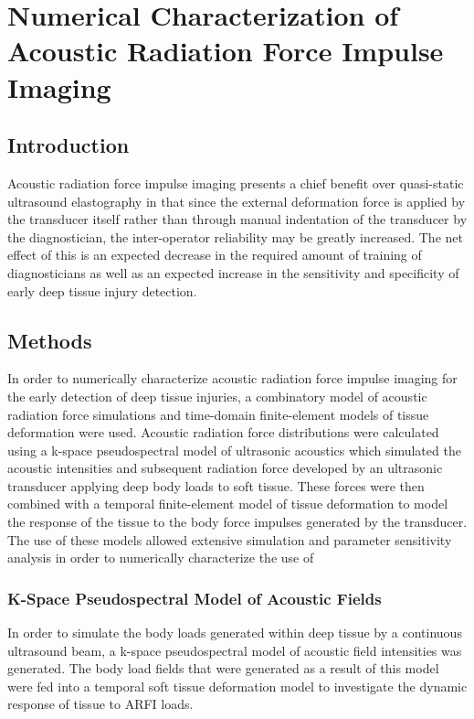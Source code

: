 \chapter{Numerical Characterization of Acoustic Radiation Force Impulse Imaging}
	\label{chap:arfi}
	\section{Introduction}
		Acoustic radiation force impulse imaging presents a chief benefit over quasi-static ultrasound elastography in that since the external deformation force is applied by the transducer itself rather than through manual indentation of the transducer by the diagnostician, the inter-operator reliability may be greatly increased. The net effect of this is an expected decrease in the required amount of training of diagnosticians as well as an expected increase in the sensitivity and specificity of early deep tissue injury detection.

	\section{Methods}
	\label{sec:arfi_methods}
		In order to numerically characterize acoustic radiation force impulse imaging for the early detection of deep tissue injuries, a combinatory model of acoustic radiation force simulations and time-domain finite-element models of tissue deformation were used. Acoustic radiation force distributions were calculated using a k-space pseudospectral model of ultrasonic acoustics which simulated the acoustic intensities and subsequent radiation force developed by an ultrasonic transducer applying deep body loads to soft tissue. These forces were then combined with a temporal finite-element model of tissue deformation to model the response of the tissue to the body force impulses generated by the transducer. The use of these models allowed extensive simulation and parameter sensitivity analysis in order to numerically characterize the use of 

		\subsection{K-Space Pseudospectral Model of Acoustic Fields}
		\label{subsec:kspace_model}
			In order to simulate the body loads generated within deep tissue by a continuous ultrasound beam, a k-space pseudospectral model of acoustic field intensities was generated. The body load fields that were generated as a result of this model were fed into a temporal soft tissue deformation model to investigate the dynamic response of tissue to ARFI loads.

